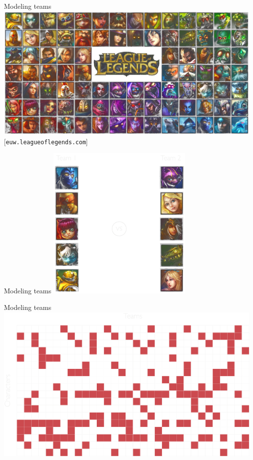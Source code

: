 \documentclass[mathserif]{beamer}
\newcommand{\qsource}[1]{%
{\color{col1}\tiny\hfill[#1]}
}
\begin{document}
\begin{frame}{Modeling teams}
\includegraphics[width=\textwidth]{figures/champions_transparent.png}\\
\qsource{\texttt{euw.leagueoflegends.com}}
\end{frame}

\begin{frame}{Modeling teams}
\centering
\includegraphics[height=3in]{figures/champions5v5.pdf}
\end{frame}

\begin{frame}{Modeling teams}
\centering
\includegraphics[width=\textwidth]{figures/grid_hots.pdf}
\end{frame}
\end{document}
